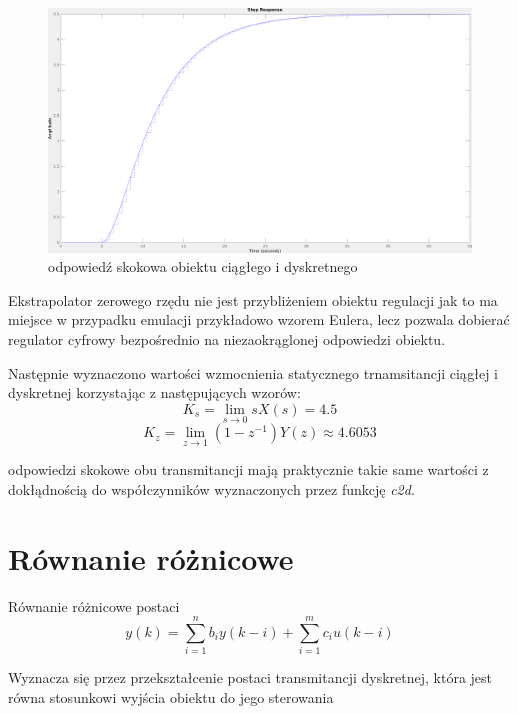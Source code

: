 \documentclass[fleqn]{article}
\begin{document}
\begin{figure}[H]
	\centering
	\includegraphics[width=\textwidth]{scripts/odpowiedzskok.png}
	\caption{odpowiedź skokowa obiektu ciągłego i dyskretnego}
	\label{}
\end{figure}

 Ekstrapolator zerowego rzędu nie jest przybliżeniem obiektu regulacji jak to ma miejsce w przypadku emulacji przykładowo wzorem Eulera, lecz pozwala dobierać regulator cyfrowy bezpośrednio na niezaokrąglonej odpowiedzi obiektu.

 Następnie wyznaczono wartości wzmocnienia statycznego trnamsitancji ciągłej i dyskretnej korzystając z następujących wzorów:
{\Large
\begin{equation}
	K_s=\lim_{s\to 0}sX(s)= 4.5
\end{equation}
\begin{equation}
	K_z=\lim_{z\to 1}(1-z^{-1})Y(z)\approx 4.6053
\end{equation}
}

odpowiedzi skokowe obu transmitancji mają praktycznie takie same wartości z dokłądnością do współczynników wyznaczonych przez funkcję \textit{c2d}.

\section{Równanie różnicowe}

Równanie różnicowe postaci
{\Large
\begin{equation}
		y(k)=\sum\limits_{i=1}^{n}b_iy(k-i)+\sum\limits_{i=1}^mc_iu(k-i)
\end{equation}
}

Wyznacza się przez przekształcenie postaci transmitancji dyskretnej, która jest równa stosunkowi wyjścia obiektu do jego sterowania
\end{document}
